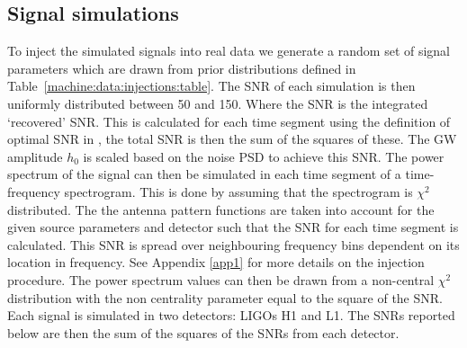 \subsection{\label{machine:data:injections} Signal simulations}

%
To inject the simulated signals into real data we generate a random set of signal
parameters which are drawn from prior distributions defined in
Table~\ref{machine:data:injections:table}. The \gls{SNR} of each simulation is then uniformly distributed between 50 and 150. Where the \gls{SNR} is the integrated `recovered' \gls{SNR}. This is calculated for each time segment using the definition of optimal \gls{SNR} in \cite{prix2007SearchContinuous}, the total \gls{SNR} is then the sum of the squares of these.
The \gls{GW} amplitude $h_{0}$ is scaled based on the noise \gls{PSD} to achieve this \gls{SNR}. 
The power spectrum of the signal can then be simulated in each time segment of a time-frequency spectrogram. This is done by assuming that the spectrogram is $\chi^2$ distributed.
The the antenna pattern functions are taken into account for the given source parameters and detector such that the \gls{SNR} for each time segment is calculated.
This \gls{SNR} is spread over neighbouring frequency bins dependent on its location in frequency. See Appendix \ref{app1} for more details on the injection procedure.
The power spectrum values can then be drawn from a non-central $\chi^2$ distribution with the non centrality parameter equal to the square of the \gls{SNR}.
Each signal is simulated in two detectors: \glspl{LIGO} H1 and L1.
The \glspl{SNR} reported below are then the sum of the squares of the \glspl{SNR} from each detector.



